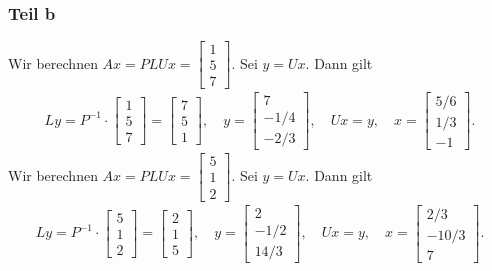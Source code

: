 \documentclass[fleqn,draft,a5paper]{article}
\theoremstyle{remark}
\begin{document}
\subsubsection{Teil b}
Wir berechnen \(A x = PLUx =
\begin{bmatrix}
  1 \\ 5 \\ 7
\end{bmatrix}
\).  Sei \(y = Ux\).  Dann gilt
\begin{align*}
  L y =
  P^{-1} \cdot
  \begin{bmatrix}
    1 \\ 5 \\ 7
  \end{bmatrix} =
  \begin{bmatrix}
    7 \\ 5 \\ 1
  \end{bmatrix}, \quad
  y =
  \begin{bmatrix}
    7 \\ -1/4 \\ -2/3
  \end{bmatrix}, \quad
  Ux = y, \quad
  x =
  \begin{bmatrix}
    5/6 \\ 1/3 \\ -1
  \end{bmatrix}.
\end{align*}
Wir berechnen \(A x = PLUx =
\begin{bmatrix}
  5 \\ 1 \\ 2
\end{bmatrix}
\).  Sei \(y = Ux\).  Dann gilt
\begin{align*}
  L y =
  P^{-1} \cdot
  \begin{bmatrix}
    5 \\ 1 \\ 2
  \end{bmatrix} =
  \begin{bmatrix}
    2 \\ 1 \\ 5
  \end{bmatrix}, \quad
  y =
  \begin{bmatrix}
    2 \\ -1/2 \\ 14/3
  \end{bmatrix}, \quad
  Ux = y, \quad
  x =
  \begin{bmatrix}
    2/3 \\ -10/3 \\ 7
  \end{bmatrix}.
\end{align*}
\end{document}
